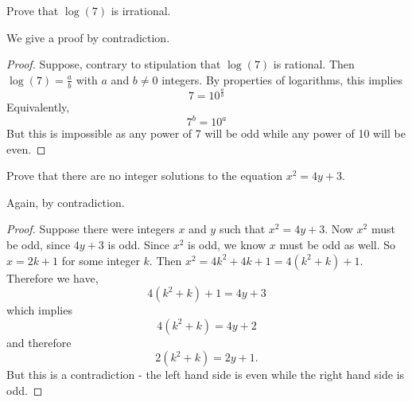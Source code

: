 \documentclass[11pt]{exam}
\def\filename{Practice01-Logic}
\def\ansfilename{\filename-solutions}
\begin{document}
\begin{questions}
\begin{answer}
\end{answer}



\question Prove that $\log(7)$ is irrational.

\begin{answer}
  We give a proof by contradiction.
\begin{proof}
  Suppose, contrary to stipulation that $\log(7)$ is rational.  Then $\log(7) = \frac{a}{b}$ with $a$ and $b \ne 0$ integers.  By properties of logarithms, this implies
  \[7 = 10^{\frac{a}{b}}\]
  Equivalently,
  \[7^b = 10^a\]
  But this is impossible as any power of 7 will be odd while any power of 10 will be even.
\end{proof}
\end{answer}



\question Prove that there are no integer solutions to the equation $x^2 = 4y + 3$.

\begin{answer}
  Again, by contradiction.
\begin{proof}
  Suppose there were integers $x$ and $y$ such that $x^2 = 4y + 3$.  Now $x^2$ must be odd, since $4y + 3$ is odd.  Since $x^2$ is odd, we know $x$ must be odd as well.  So $x = 2k + 1$ for some integer $k$.  Then $x^2 = 4k^2 + 4k + 1 = 4(k^2 + k) + 1$.  Therefore we have,
  \[4(k^2 + k) + 1 = 4y + 3\]
  which implies
  \[4(k^2 + k) = 4y + 2\]
  and therefore
  \[2(k^2 + k) = 2y + 1.\]
  But this is a contradiction - the left hand side is even while the right hand side is odd. 
\end{proof}

\end{answer}


 
\end{questions}


\Closesolutionfile{\ansfilename}
\end{document}
